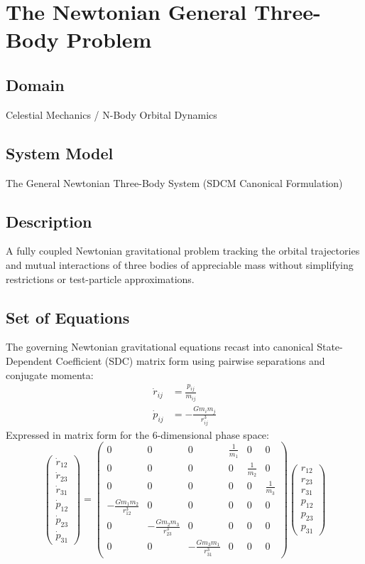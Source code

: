 \chapter{The Newtonian General Three-Body Problem}

\section{Domain}
Celestial Mechanics  / N-Body Orbital Dynamics

\section{System Model}
The General Newtonian Three-Body System (SDCM Canonical Formulation)

\section{Description}
A fully coupled Newtonian gravitational problem tracking the orbital trajectories and mutual interactions of three bodies of appreciable mass without simplifying restrictions or test-particle approximations.

\section{Set of Equations}
The governing Newtonian gravitational equations recast into canonical State-Dependent Coefficient (SDC) matrix form using pairwise separations and conjugate momenta:
\begin{align}
\dot{r}_{ij} &= \frac{p_{ij}}{m_{ij}} \\
\dot{p}_{ij} &= -\frac{G m_i m_j}{r_{ij}^3}
\end{align}
Expressed in matrix form for the 6-dimensional phase space:
\begin{equation}
\begin{pmatrix} \dot{r}_{12} \\ \dot{r}_{23} \\ \dot{r}_{31} \\ \dot{p}_{12} \\ \dot{p}_{23} \\ \dot{p}_{31} \end{pmatrix} = \begin{pmatrix} 0 & 0 & 0 & \frac{1}{m_1} & 0 & 0 \\ 0 & 0 & 0 & 0 & \frac{1}{m_2} & 0 \\ 0 & 0 & 0 & 0 & 0 & \frac{1}{m_3} \\ -\frac{G m_1 m_2}{r_{12}^3} & 0 & 0 & 0 & 0 & 0 \\ 0 & -\frac{G m_2 m_3}{r_{23}^3} & 0 & 0 & 0 & 0 \\ 0 & 0 & -\frac{G m_3 m_1}{r_{31}^3} & 0 & 0 & 0 \end{pmatrix} \begin{pmatrix} r_{12} \\ r_{23} \\ r_{31} \\ p_{12} \\ p_{23} \\ p_{31} \end{pmatrix}
\end{equation}


